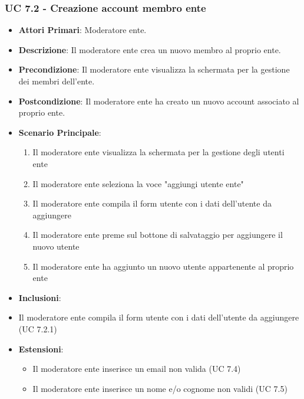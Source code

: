 			\subsubsection{UC 7.2 - Creazione account membro ente}
			\begin{itemize}
				\item \textbf{Attori Primari}: Moderatore ente.
				\item \textbf{Descrizione}: Il moderatore ente crea un nuovo membro al proprio ente.
				\item \textbf{Precondizione}: Il moderatore ente visualizza la schermata per la gestione dei membri dell'ente.
				\item \textbf{Postcondizione}: Il moderatore ente ha creato un nuovo account associato al proprio ente.
				\item \textbf{Scenario Principale}:
				\begin{enumerate}
					\item{Il moderatore ente visualizza la schermata per la gestione degli utenti ente}
					\item{Il moderatore ente seleziona la voce "aggiungi utente ente"}
					\item{Il moderatore ente compila il form utente con i dati dell'utente da aggiungere}
					\item{Il moderatore ente preme sul bottone di salvataggio per aggiungere il nuovo utente}
					\item{Il moderatore ente ha aggiunto un nuovo utente appartenente al proprio ente}
				\end{enumerate}	
				\item \textbf{Inclusioni}:
					\item Il moderatore ente compila il form utente con i dati dell'utente da aggiungere (UC 7.2.1)
				\item \textbf{Estensioni}:
				\begin{itemize}
					\item Il moderatore ente inserisce un email non valida (UC 7.4)
					\item Il moderatore ente inserisce un nome e/o cognome non validi (UC 7.5)
				\end{itemize}
			\end{itemize}
			
